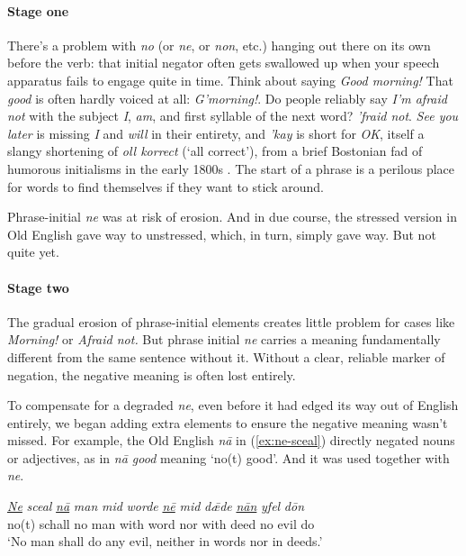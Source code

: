 \paragraph{Stage one}
There's a problem with \textit{no} (or \textit{ne}, or \textit{non}, etc.) hanging out there on its own before the verb: that initial negator often gets swallowed up when your speech apparatus fails to engage quite in time. Think about saying \textit{Good morning!} That \textit{good} is often hardly voiced at all: \textit{G'morning!}. Do people reliably say \textit{I'm afraid not} with the subject \textit{I}, \textit{am}, and first syllable of the next word? \textit{'fraid not}. \textit{See you later} is missing \textit{I} and \textit{will} in their entirety, and \textit{'kay} is short for \textit{OK}, itself a slangy shortening of \textit{oll korrect} (`all correct'), from a brief Bostonian fad of humorous initialisms in the early 1800s \citep{OK}. The start of a phrase is a perilous place for words to find themselves if they want to stick around.

Phrase-initial \textit{ne} was at risk of erosion. And in due course, the stressed version in Old English gave way to unstressed, which, in turn, simply gave way. But not quite yet.

\paragraph{Stage two}

The gradual erosion of phrase-initial elements creates little problem for cases like \textit{Morning!} or \textit{Afraid not.} But phrase initial \textit{ne} carries a meaning fundamentally different from the same sentence without it. Without a clear, reliable marker of negation, the negative meaning is often lost entirely.

To compensate for a degraded \textit{ne}, even before it had edged its way out of English entirely, we began adding extra elements to ensure the negative meaning wasn't missed. For example, the Old English \textit{nā} in (\ref{ex:ne-sceal}) directly negated nouns or adjectives, as in \textit{nā good} meaning `no(t) good'. And it was used together with \textit{ne}.

\ea \label{ex:ne-sceal}
    \gll \uline{\textit{Ne}} \textit{sceal} \uline{\textit{nā}} \textit{man} \textit{mid} \textit{worde} \uline{\textit{nē}} \textit{mid} \textit{dǣde} \uline{\textit{nān}} \textit{yfel} \textit{dōn}  \\ no(t) schall no man with word nor with deed no evil do \\
    \trans `No man shall do any evil, neither in words nor in deeds.'
\z

